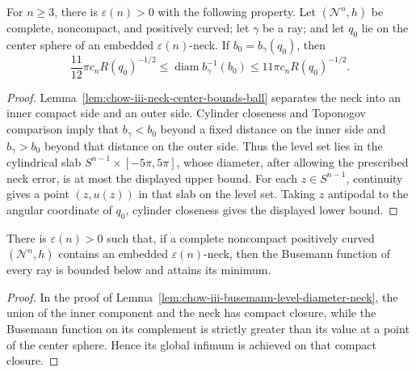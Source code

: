 \begin{lemma}
\label{lem:chow-iii-busemann-level-diameter-neck}
For \(n\ge3\), there is \(\varepsilon(n)>0\) with the following property.
Let \((\mathcal N^n,h)\) be complete, noncompact, and positively curved; let
\(\gamma\) be a ray; and let \(q_0\) lie on the center sphere of an embedded
\(\varepsilon(n)\)-neck.  If \(b_0=b_\gamma(q_0)\), then
\[
 \frac{11}{12}\pi c_nR(q_0)^{-1/2}
 \le\operatorname{diam}b_\gamma^{-1}(b_0)
 \le11\pi c_nR(q_0)^{-1/2}.
\]
\end{lemma}
\begin{proof}
Lemma~\ref{lem:chow-iii-neck-center-bounds-ball} separates the neck into an
inner compact side and an outer side.  Cylinder closeness and Toponogov
comparison imply that \(b_\gamma<b_0\) beyond a fixed distance on the inner
side and \(b_\gamma>b_0\) beyond that distance on the outer side.  Thus the
level set lies in the cylindrical slab \(S^{n-1}\times[-5\pi,5\pi]\), whose
diameter, after allowing the prescribed neck error, is at most the displayed
upper bound.  For each \(z\in S^{n-1}\), continuity gives a point
\((z,u(z))\) in that slab on the level set.  Taking \(z\) antipodal to the
angular coordinate of \(q_0\), cylinder closeness gives the displayed lower
bound.
\end{proof}

\begin{lemma}
\label{lem:chow-iii-busemann-attains-minimum}
There is \(\varepsilon(n)>0\) such that, if a complete noncompact positively
curved \((\mathcal N^n,h)\) contains an embedded \(\varepsilon(n)\)-neck,
then the Busemann function of every ray is bounded below and attains its
minimum.
\end{lemma}
\begin{proof}
In the proof of Lemma~\ref{lem:chow-iii-busemann-level-diameter-neck}, the
union of the inner component and the neck has compact closure, while the
Busemann function on its complement is strictly greater than its value at a
point of the center sphere.  Hence its global infimum is achieved on that
compact closure.
\end{proof}

